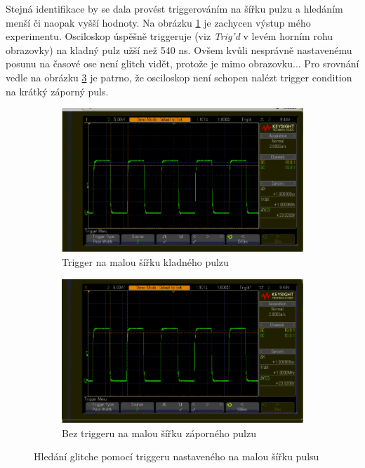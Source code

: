 \documentclass[twoside]{article}
\begin{document}
Stejná identifikace by se dala provést triggerováním na šířku pulzu a hledáním menší či naopak vyšší hodnoty. Na obrázku \ref{fig:pos_width}
je zachycen výstup mého experimentu. Osciloskop úspěšně triggeruje (viz \textit{Trig'd} v levém horním rohu obrazovky) na kladný pulz užší než 540 ns.
Ovšem kvůli nesprávně nastavenému posunu na časové ose není glitch vidět, protože je mimo obrazovku... Pro srovnání vedle na obrázku \ref{fig:neg_width} je patrno,
že osciloskop není schopen nalézt trigger condition na krátký záporný puls.

\begin{figure}[htbp]
	\centering
	\begin{subfigure}{0.45\textwidth}
		\includegraphics[width=\linewidth]{trigger_pulsewidth_pos_trigged_wut.png                      }
		\caption{Trigger na malou šířku kladného pulzu}
		\label{fig:pos_width}
	\end{subfigure}
	\begin{subfigure}{0.45\textwidth}
		\includegraphics[width=\linewidth]{trigger_pulsewidth_never.png                    }
		\caption{Bez triggeru na malou šířku záporného pulzu}
		\label{fig:neg_width}
	\end{subfigure}
	\caption{Hledání glitche pomocí triggeru nastaveného na malou šířku pulsu}
\end{figure}
\end{document}
